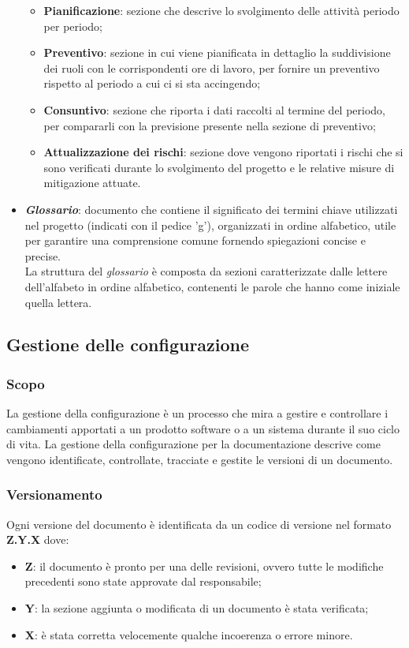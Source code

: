 \begin{itemize}
\begin{itemize}
                \item \textbf{Pianificazione}: sezione che descrive lo svolgimento delle attività periodo per periodo;
                \item \textbf{Preventivo}: sezione in cui viene pianificata in dettaglio la suddivisione dei ruoli con le corrispondenti ore di lavoro, per fornire un preventivo rispetto al periodo a cui ci si sta accingendo;
                \item \textbf{Consuntivo}: sezione che riporta i dati raccolti al termine del periodo, per compararli con la previsione presente nella sezione di preventivo;
                \item \textbf{Attualizzazione dei rischi}: sezione dove vengono riportati i rischi che si sono verificati durante lo svolgimento del progetto e le relative misure di mitigazione attuate.
            \end{itemize}
            \item \textit{\textbf{Glossario}}: documento che contiene il significato dei termini chiave utilizzati nel progetto (indicati con il pedice 'g'), organizzati in ordine alfabetico, utile per garantire una comprensione comune fornendo spiegazioni concise e precise.
            \\La struttura del \textit{glossario} è composta da sezioni caratterizzate dalle lettere dell'alfabeto in ordine alfabetico, contenenti le parole che hanno come iniziale quella lettera.
        \end{itemize}

    \subsection{Gestione delle configurazione}
        \subsubsection{Scopo}
        La gestione della configurazione è un processo che mira a gestire e controllare i cambiamenti apportati
        a un prodotto software o a un sistema durante il suo ciclo di vita. La gestione della configurazione per
        la documentazione descrive come vengono identificate, controllate, tracciate e gestite le versioni di un
        documento.
        \subsubsection{Versionamento}
        Ogni versione del documento è identificata da un codice di versione nel formato \textbf{Z.Y.X} dove:
        \begin{itemize}
            \item \textbf{Z}: il documento è pronto per una delle revisioni, ovvero tutte le modifiche precedenti sono state approvate dal responsabile;
            \item \textbf{Y}: la sezione aggiunta o modificata di un documento è stata verificata;
            \item \textbf{X}: è stata corretta velocemente qualche incoerenza o errore minore.
        \end{itemize}

